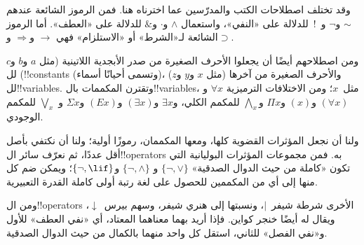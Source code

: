 \documentclass[../../../include/open-logic-section]{subfiles}
\begin{document}

\begin{intro}
وقد تختلف اصطلاحات الكتب والمدرّسين عما اخترناه هنا. فمن الرموز
الشائعة عندهم $\sim$ و$\neg$ و~!\ للدلالة على
«النفي»، واستعمال $\wedge$ و$\cdot$ و$\&$ للدلالة على «العطف». أما
الرموز الشائعة لـ«الشرط» أو «الاستلزام» فهي $\rightarrow$
و$\Rightarrow$ و$\supset$.

ومن اصطلاحهم أيضًا أن يجعلوا الأحرف الصغيرة من صدر الأبجدية اللاتينية (مثل
$a$ و$b$ و$c$) لل!!{constant}s (وتسمى أحيانًا أسماء)، والأحرف
الصغيرة من آخرها (مثل $x$ و$y$ و$z$) لل!!{variable}s. وتقترن
المكممات بال!!{variable}s، مثل~$x$؛ ومن الاختلافات الترميزية
$\forall x$ و$(\forall x)$ و$(x)$ و$\Pi x$ و$\bigwedge_x$ للمكمم
الكلي، و$\exists x$ و$(\exists x)$ و$(Ex)$ و$\Sigma x$ و
$\bigvee_x$ للمكمم الوجودي.
\end{intro}

\begin{explain}
ولنا أن نجعل المؤثرات القضوية كلها، ومعها المكممان، رموزًا أولية؛
ولنا أن نكتفي بأصل أقل عددًا، ثم نعرّف سائر
ال!!{operator}s به. فمن مجموعات المؤثرات البوليانية التي تكون
«كاملة من حيث الدوال الصدقية» $\{ \lnot, \lor \}$ و
$\{ \lnot, \land \}$ و$\{ \lnot, \lif\}$؛ ويمكن ضم كل منها إلى أي
من المكممين للحصول على لغة رتبة أولى كاملة القدرة التعبيرية.

ومن ال!!{operator}s الأخرى شرطة شيفر~$|$، ونسبتها إلى
هنري شيفر، وسهم بيرس~$\downarrow$، ويقال له أيضًا خنجر كواين.
فإذا أريد بهما معناهما المعتاد، أي «نفي العطف» للأول و«نفي الفصل»
للثاني، استقل كل واحد منهما بالكمال من حيث الدوال الصدقية.
\end{explain}
\end{document}
